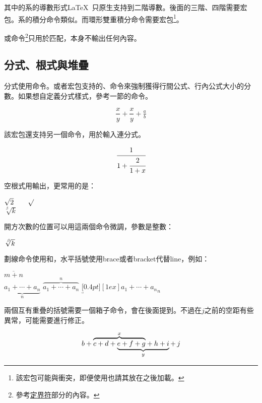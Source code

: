 其中的系的導數形式\LaTeX\ 只原生支持到二階導數。後面的三階、四階需要宏包。系的積分命令類似。而環形雙重積分命令需要宏包\footnote{該宏包可能與衝突，即便使用也請其放在之後加載。}。

或命令\footnote{參考\hyperref[subsec:delimiter]{定界符}部分的內容。}只用於匹配，本身不輸出任何內容。

\subsection{分式、根式與堆疊}
分式使用命令。或者宏包支持的、命令來強制獲得行間公式、行內公式大小的分數。如果想自定義分式樣式，參考一節的命令。
\begin{codeshow}
\[\frac{x}{y}+\dfrac{x}{y}
+\tfrac{a}{b}\]
\end{codeshow}

該宏包還支持另一個命令，用於輸入連分式。
\begin{codeshow}
\[\cfrac{1}{1+\cfrac{2}{1+x}}\]
\end{codeshow}

空根式用輸出，更常用的是：
\begin{codeshow}
$\sqrt{2} \qquad \surd$\\
$\sqrt[\beta]{k}$
\end{codeshow}

開方次數的位置可以用這兩個命令微調，參數是整數：
\begin{codeshow}
$\sqrt[\leftroot{-2}\uproot{2} \beta]{k}$
\end{codeshow}

劃線命令使用和，水平括號使用brace或者bracket代替line，例如：

\begin{codeshow}
$\overline{m+n}$ \\
$\underbrace{a_1+\cdots+a_n}_{n}$
$\overbrace{a_1+\cdots+a_n}^{n}$
$\underbracket[0.4pt][1ex]
  {a_1+\cdots+a_n}_n$
\end{codeshow}

兩個互有重疊的括號需要一個箱子命令，會在後面提到。不過在$j$之前的空距有些異常，可能需要\latexline{,}進行修正。
\begin{codeshow}
\[b+\rlap{$\overbrace{\phantom{
  c+d+e+f+g}}^x$}c+d+\underbrace{
  e+f+g+h+i}_y+\,j \]
\end{codeshow}

